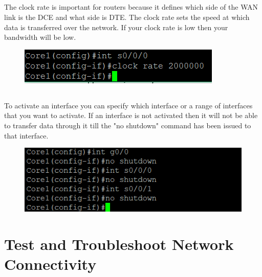 \documentclass{article}
\begin{document}
\subsection{}
The clock rate is important for routers because it defines which side of the WAN link is the DCE and what side is DTE. The clock rate sets the speed at which data is transferred over the network. If your clock rate is low then your bandwidth will be low.
\begin{figure}[h]
	\includegraphics[width=1\linewidth]{"clock rate"}
	\caption{}
\end{figure}
\newpage
\subsection{}
To activate an interface you can specify which interface or a range of interfaces that you want to activate. If an interface is not activated then it will not be able to transfer data through it till the "no shutdown" command has been issued to that interface.
\begin{figure}[h]
	\includegraphics[width=1\linewidth]{"activate interfaces"}
	\caption{}
	\label{fig:activate-interfaces}
\end{figure}
\newpage
\section{Test and Troubleshoot Network Connectivity}
\end{document}
